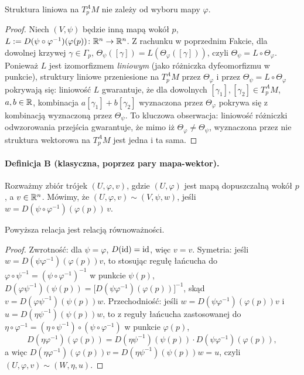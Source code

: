 \begin{fakt}
Struktura liniowa na $T_p^AM$ nie zależy od wyboru mapy $\varphi$.
\end{fakt}
\begin{proof}
Niech $(V,\psi)$ będzie inną mapą wokół $p$, $L:=D(\psi\circ\varphi^{-1})(\varphi(p))
\colon\mathbb{R}^n\to\mathbb{R}^n$. Z rachunku w poprzednim Fakcie, dla dowolnej krzywej $\gamma\in\Gamma_p$,
$\Theta_\psi([\gamma])=L(\Theta_\varphi([\gamma]))$, czyli $\Theta_\psi=L\circ\Theta_\varphi$.
Ponieważ $L$ jest izomorfizmem \emph{liniowym} (jako różniczka dyfeomorfizmu w punkcie),
struktury liniowe przeniesione na $T_p^AM$ przez $\Theta_\varphi$ i przez $\Theta_\psi=
L\circ\Theta_\varphi$ pokrywają się: liniowość $L$ gwarantuje, że dla dowolnych $[\gamma_1],
[\gamma_2]\in T_p^AM$, $a,b\in\mathbb{R}$, kombinacja $a[\gamma_1]+b[\gamma_2]$ wyznaczona przez
$\Theta_\varphi$ pokrywa się z kombinacją wyznaczoną przez $\Theta_\psi$. To kluczowa
obserwacja: liniowość różniczki odwzorowania przejścia gwarantuje, że mimo iż
$\Theta_\varphi\neq\Theta_\psi$, wyznaczona przez nie struktura wektorowa na $T_p^AM$ jest
jedna i ta sama.
\end{proof}

\paragraph*{Definicja B (klasyczna, poprzez pary mapa-wektor).} Rozważmy zbiór trójek
$(U,\varphi,v)$, gdzie $(U,\varphi)$ jest mapą dopuszczalną wokół $p$, a $v\in\mathbb{R}^n$.
Mówimy, że $(U,\varphi,v)\sim(V,\psi,w)$, jeśli $w=D(\psi\circ\varphi^{-1})(\varphi(p))\,v$.

\begin{fakt}
Powyższa relacja jest relacją równoważności.
\end{fakt}
\begin{proof}
Zwrotność: dla $\psi=\varphi$, $D(\mathrm{id})=\mathrm{id}$, więc $v=v$. Symetria: jeśli $w=D(\psi\varphi^{-1})
(\varphi(p))v$, to stosując regułę łańcucha do $\varphi\circ\psi^{-1}=(\psi\circ
\varphi^{-1})^{-1}$ w punkcie $\psi(p)$, $D(\varphi\psi^{-1})(\psi(p))=\big[D(\psi\varphi^{-1})
(\varphi(p))\big]^{-1}$, skąd $v=D(\varphi\psi^{-1})(\psi(p))w$. Przechodniość: jeśli
$w=D(\psi\varphi^{-1})(\varphi(p))v$ i $u=D(\eta\psi^{-1})(\psi(p))w$, to z reguły łańcucha
zastosowanej do $\eta\circ\varphi^{-1}=(\eta\circ\psi^{-1})\circ(\psi\circ\varphi^{-1})$ w
punkcie $\varphi(p)$,
\[
D(\eta\varphi^{-1})(\varphi(p))=D(\eta\psi^{-1})(\psi(p))\cdot D(\psi\varphi^{-1})(\varphi(p)),
\]
a więc $D(\eta\varphi^{-1})(\varphi(p))v=D(\eta\psi^{-1})(\psi(p))w=u$, czyli
$(U,\varphi,v)\sim(W,\eta,u)$.
\end{proof}

